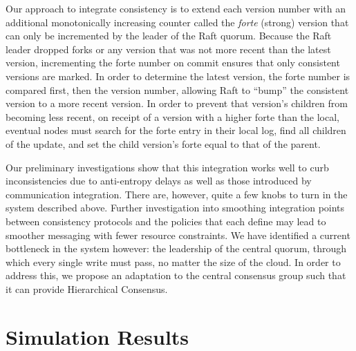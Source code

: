 \documentclass[10pt,conference,letterpaper]{IEEEtran}
\begin{document}
Our approach to integrate consistency is to extend each version number with an additional monotonically increasing counter called the \textit{forte} (strong) version that can only be incremented by the leader of the Raft quorum. Because the Raft leader dropped forks or any version that was not more recent than the latest version, incrementing the forte number on commit ensures that only consistent versions are marked. In order to determine the latest version, the forte number is compared first, then the version number, allowing Raft to ``bump'' the consistent version to a more recent version. In order to prevent that version's children from becoming less recent, on receipt of a version with a higher forte than the local, eventual nodes must search for the forte entry in their local log, find all children of the update, and set the child version's forte equal to that of the parent.

Our preliminary investigations show that this integration works well to curb inconsistencies due to anti-entropy delays as well as those introduced by communication integration. There are, however, quite a few knobs to turn in the system described above. Further investigation into smoothing integration points between consistency protocols and the policies that each define may lead to smoother messaging with fewer resource constraints. We have identified a current bottleneck in the system however: the leadership of the central quorum, through which every single write must pass, no matter the size of the cloud. In order to address this, we propose an adaptation to the central consensus group such that it can provide Hierarchical Consensus.

\section{Simulation Results}
\end{document}
